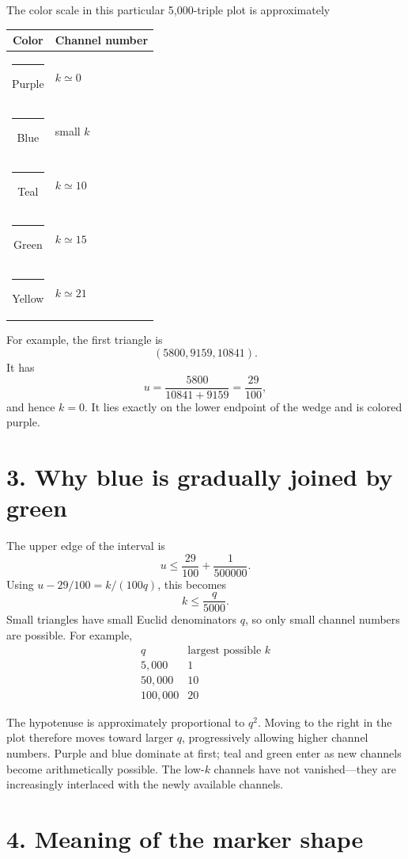 \documentclass[11pt]{article}
\begin{document}
The color scale in this particular 5,000-triple plot is approximately
\begin{center}
\begin{tabular}{cl}
\toprule
Color & Channel number \\
\midrule
\textcolor{channelpurple}{\rule{1.5em}{0.8em}} Purple & $k\simeq 0$ \\
\textcolor{channelblue}{\rule{1.5em}{0.8em}} Blue & small $k$ \\
\textcolor{channelteal}{\rule{1.5em}{0.8em}} Teal & $k\simeq 10$ \\
\textcolor{channelgreen}{\rule{1.5em}{0.8em}} Green & $k\simeq 15$ \\
\textcolor{channelyellow}{\rule{1.5em}{0.8em}} Yellow & $k\simeq 21$ \\
\bottomrule
\end{tabular}
\end{center}

For example, the first triangle is
\[
  (5800,9159,10841).
\]
It has
\[
  u=\frac{5800}{10841+9159}=\frac{29}{100},
\]
and hence $k=0$.  It lies exactly on the lower endpoint of the wedge and is
colored purple.

\section*{3. Why blue is gradually joined by green}

The upper edge of the interval is
\[
  u\leq \frac{29}{100}+\frac{1}{500000}.
\]
Using $u-29/100=k/(100q)$, this becomes
\[
  \boxed{k\leq\frac{q}{5000}.}
\]
Small triangles have small Euclid denominators $q$, so only small channel
numbers are possible.  For example,
\[
\begin{array}{c|c}
q & \text{largest possible }k \\
\hline
5{,}000 & 1 \\
50{,}000 & 10 \\
100{,}000 & 20
\end{array}
\]

The hypotenuse is approximately proportional to $q^2$.  Moving to the right in
the plot therefore moves toward larger $q$, progressively allowing higher
channel numbers.  Purple and blue dominate at first; teal and green enter as
new channels become arithmetically possible.  The low-$k$ channels have not
vanished---they are increasingly interlaced with the newly available channels.

\section*{4. Meaning of the marker shape}
\end{document}
